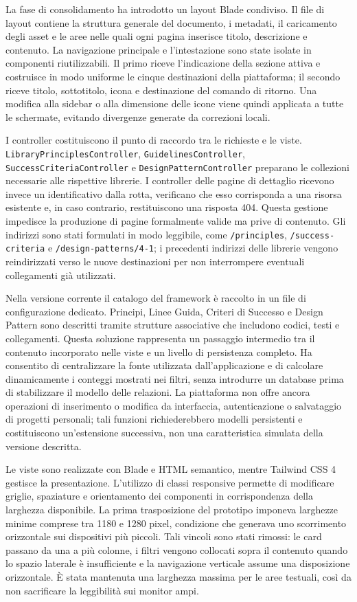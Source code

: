 La fase di consolidamento ha introdotto un layout Blade condiviso. Il file di layout contiene la struttura generale del documento, i metadati, il caricamento degli asset e le aree nelle quali ogni pagina inserisce titolo, descrizione e contenuto. La navigazione principale e l'intestazione sono state isolate in componenti riutilizzabili. Il primo riceve l'indicazione della sezione attiva e costruisce in modo uniforme le cinque destinazioni della piattaforma; il secondo riceve titolo, sottotitolo, icona e destinazione del comando di ritorno. Una modifica alla sidebar o alla dimensione delle icone viene quindi applicata a tutte le schermate, evitando divergenze generate da correzioni locali.

I controller costituiscono il punto di raccordo tra le richieste e le viste. \texttt{LibraryPrinciplesController}, \texttt{GuidelinesController}, \texttt{SuccessCriteriaController} e \texttt{DesignPatternController} preparano le collezioni necessarie alle rispettive librerie. I controller delle pagine di dettaglio ricevono invece un identificativo dalla rotta, verificano che esso corrisponda a una risorsa esistente e, in caso contrario, restituiscono una risposta 404. Questa gestione impedisce la produzione di pagine formalmente valide ma prive di contenuto. Gli indirizzi sono stati formulati in modo leggibile, come \texttt{/principles}, \texttt{/success-criteria} e \texttt{/design-patterns/4-1}; i precedenti indirizzi delle librerie vengono reindirizzati verso le nuove destinazioni per non interrompere eventuali collegamenti già utilizzati.

Nella versione corrente il catalogo del framework è raccolto in un file di configurazione dedicato. Principi, Linee Guida, Criteri di Successo e Design Pattern sono descritti tramite strutture associative che includono codici, testi e collegamenti. Questa soluzione rappresenta un passaggio intermedio tra il contenuto incorporato nelle viste e un livello di persistenza completo. Ha consentito di centralizzare la fonte utilizzata dall'applicazione e di calcolare dinamicamente i conteggi mostrati nei filtri, senza introdurre un database prima di stabilizzare il modello delle relazioni. La piattaforma non offre ancora operazioni di inserimento o modifica da interfaccia, autenticazione o salvataggio di progetti personali; tali funzioni richiederebbero modelli persistenti e costituiscono un'estensione successiva, non una caratteristica simulata della versione descritta.

Le viste sono realizzate con Blade e HTML semantico, mentre Tailwind CSS 4 gestisce la presentazione. L'utilizzo di classi responsive permette di modificare griglie, spaziature e orientamento dei componenti in corrispondenza della larghezza disponibile. La prima trasposizione del prototipo imponeva larghezze minime comprese tra 1180 e 1280 pixel, condizione che generava uno scorrimento orizzontale sui dispositivi più piccoli. Tali vincoli sono stati rimossi: le card passano da una a più colonne, i filtri vengono collocati sopra il contenuto quando lo spazio laterale è insufficiente e la navigazione verticale assume una disposizione orizzontale. È stata mantenuta una larghezza massima per le aree testuali, così da non sacrificare la leggibilità sui monitor ampi.


